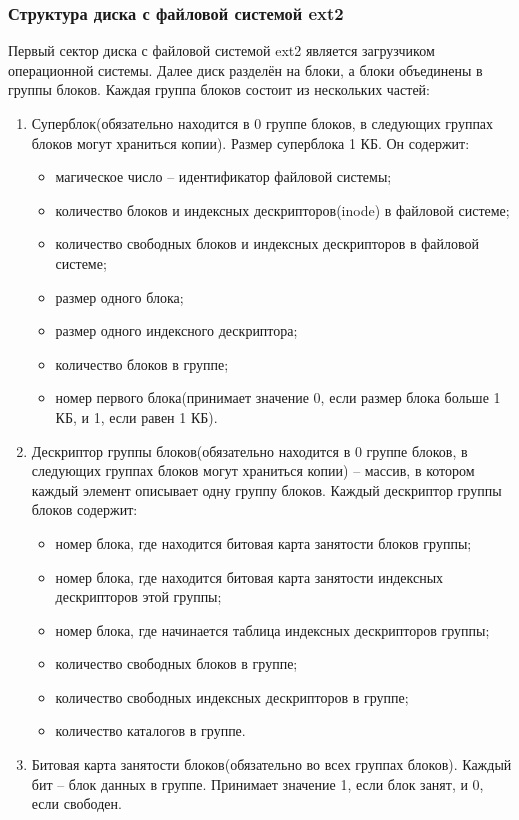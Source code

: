 \subsubsection{Структура диска с файловой системой ext2}

Первый сектор диска с файловой системой ext2 является загрузчиком операционной системы. Далее диск разделён на блоки, а блоки объединены в группы блоков.
Каждая группа блоков состоит из нескольких частей:

\begin{enumerate}
\item Суперблок(обязательно находится в 0 группе блоков, в следующих группах блоков могут храниться копии). Размер суперблока 1 КБ. Он содержит:
\begin{itemize}
\item магическое число -- идентификатор файловой системы;
\item количество блоков и индексных дескрипторов(inode) в файловой системе;
\item количество свободных блоков и индексных дескрипторов в файловой системе;
\item размер одного блока;
\item размер одного индексного дескриптора;
\item количество блоков в группе;
\item номер первого блока(принимает значение 0, если размер блока больше 1 КБ, и 1, если равен 1 КБ).
\end{itemize}
\item Дескриптор группы блоков(обязательно находится в 0 группе блоков, в следующих группах блоков могут храниться копии) -- массив, в котором каждый элемент описывает одну группу блоков.
Каждый дескриптор группы блоков содержит:
\begin{itemize}
\item номер блока, где находится битовая карта занятости блоков группы;
\item номер блока, где находится битовая карта занятости индексных дескрипторов этой группы;
\item номер блока, где начинается таблица индексных дескрипторов группы;
\item количество свободных блоков в группе;
\item количество свободных индексных дескрипторов в группе;
\item количество каталогов в группе.
\end{itemize}
\item Битовая карта занятости блоков(обязательно во всех группах блоков). Каждый бит -- блок данных в группе. Принимает значение 1, если блок занят, и 0, если свободен.

\end{enumerate}
